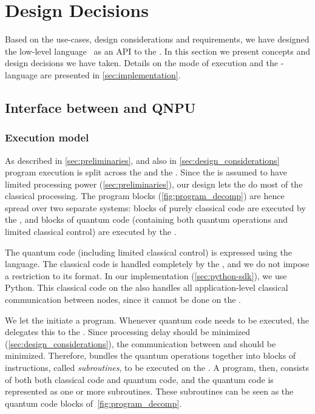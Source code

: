 \begin{itemize}
\end{itemize}


\section{Design Decisions}
\label{sec:design_decisions}
Based on the use-cases, design considerations and requirements, we have designed the low-level language \netqasm\ as an API to the \QNPU.
In this section we present concepts and design decisions we have taken.
Details on the mode of execution and the \netqasm-language are presented in \cref{sec:implementation}.

\subsection{Interface between \host and QNPU}
\label{sec:design_decisions_interface}

\subsubsection{Execution model}
As described in \cref{sec:preliminaries}, and also in \cref{sec:design_considerations} program execution is split across the \host and the \QNPU.
Since the \QNPU is assumed to have limited processing power (\cref{sec:preliminaries}), our design lets the \host do most of the classical processing.
The program blocks (\cref{fig:program_decomp}) are hence spread over two separate systems: blocks of purely classical code are executed by the \host, and blocks of quantum code (containing both quantum operations and limited classical control) are executed by the \QNPU.

The quantum code (including limited classical control) is expressed using the \netqasm language.
The classical code is handled completely by the \host, and we do not impose a restriction to its format.
In our implementation (\cref{sec:python-sdk}), we use Python.
This classical code on the \host also handles all application-level classical communication between nodes, since it cannot be done on the \QNPU.

We let the \host initiate a program.
Whenever quantum code needs to be executed, the \host delegates this to the \QNPU.
Since processing delay should be minimized (\cref{sec:design_considerations}), the communication between \host and \QNPU should be minimized.
Therefore, \netqasm bundles the quantum operations together into blocks of instructions, called \textit{subroutines}, to be executed on the \QNPU.
A program, then, consists of both both classical code and quantum code, and the quantum code is represented as one or more subroutines.
These subroutines can be seen as the quantum code blocks of~\cref{fig:program_decomp}.

